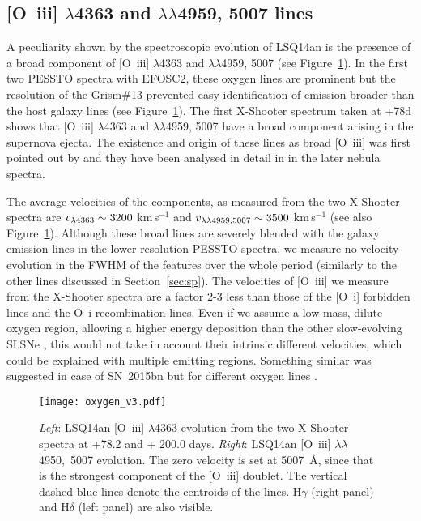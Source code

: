 \documentclass[useAMS,usenatbib]{mn2e}
\def\kms{km\,s$^{-1}$}
\def\an{LSQ14an}
\def\oiii{[O~{\sc iii}]}
\begin{document}
\subsection{[O~{\sc iii}] $\lambda$4363 and $\lambda\lambda$4959, 5007 lines}\label{sec:o3}
A peculiarity shown by the spectroscopic evolution of \an\/  
is the presence of a broad component of \oiii\/ $\lambda$4363 and $\lambda\lambda$4959, 5007 (see Figure~\ref{fig:ox}).
In the first two 
PESSTO spectra with EFOSC2, these oxygen lines are prominent but the resolution of
the Grism\#13  prevented easy identification of emission broader than the host
galaxy lines (see Figure~\ref{fig:ox}). The first X-Shooter spectrum taken at +78d  shows that 
\oiii\/ $\lambda$4363 and $\lambda\lambda$4959, 5007 have a broad component 
arising in the supernova ejecta. The existence and origin of these lines as 
broad \oiii\/ was  first pointed out by \citet[][for PS1-14bj which is a very slow-evolving SLSN]{lu16} and they have been analysed in 
detail in \cite{je16} in the later nebula spectra. 

The average velocities of the components, as measured from the two X-Shooter spectra  are $v_{\rm \lambda4363}\sim3200$ \kms\/ and $v_{\rm \lambda\lambda4959,5007}\sim3500$ \kms\/ (see also Figure~\ref{fig:ox}).
Although these broad lines are severely blended with the galaxy emission lines in the lower
resolution PESSTO spectra, we measure no velocity evolution in the FWHM of the features
over the whole period (similarly to the other lines discussed in Section~\ref{sec:sp}). 
The velocities of \oiii\/ 
we measure from the X-Shooter spectra are a factor 2-3 less than those of the [O~{\sc i}] forbidden lines and  the O~{\sc i} recombination  lines. Even if we assume a low-mass, dilute oxygen region, allowing a higher energy deposition than the other slow-evolving SLSNe \citep{je16}, this would not take in account their intrinsic different velocities, which could be explained with multiple emitting regions. Something similar was suggested in case of SN~2015bn but for different oxygen lines \citep{ni16b}.



\begin{figure}
\texttt{[image: oxygen\_v3.pdf]}
\caption{{\it Left}: \an\/ [O~{\sc iii}] $\lambda$4363 evolution from the two X-Shooter spectra at +78.2 and + 200.0 days. {\it Right}: \an\/ [O~{\sc iii}] $\lambda\lambda$4950,~5007 evolution. The zero velocity is set at 5007~\AA\/, since that is the strongest component of the [O~{\sc iii}] doublet. The vertical dashed blue lines denote the centroids of the lines. H$\gamma$ (right panel) and H$\delta$ (left panel) are also visible.}
\label{fig:ox}
\end{figure}
\end{document}
